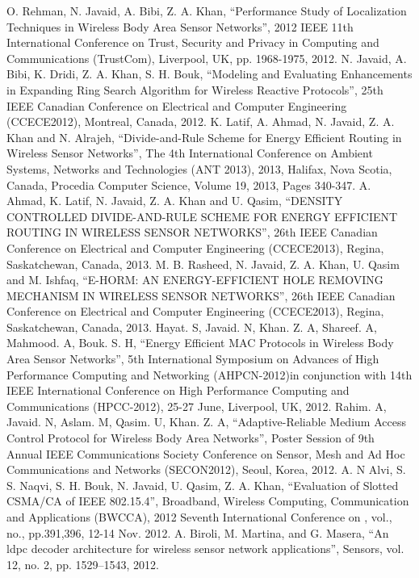 \documentclass[3p,times,procedia]{elsarticle}
\begin{document}
\vspace{-0.4cm}
\begin{thebibliography}{1}
O. Rehman, N. Javaid, A. Bibi, Z. A. Khan, ``Performance Study of Localization Techniques in Wireless Body Area Sensor Networks'', 2012 IEEE 11th International Conference on Trust, Security and Privacy in Computing and Communications (TrustCom), Liverpool, UK, pp. 1968-1975, 2012.
N. Javaid, A. Bibi, K. Dridi, Z. A. Khan, S. H. Bouk, ``Modeling and Evaluating Enhancements in Expanding Ring Search Algorithm for Wireless Reactive Protocols'', 25th IEEE Canadian Conference on Electrical and Computer Engineering (CCECE2012), Montreal, Canada, 2012.
K. Latif, A. Ahmad, N. Javaid, Z. A. Khan and N. Alrajeh, ``Divide-and-Rule Scheme for Energy Efficient Routing in Wireless Sensor Networks'', The 4th International Conference on Ambient Systems, Networks and Technologies (ANT 2013), 2013, Halifax, Nova Scotia, Canada, Procedia Computer Science, Volume 19, 2013, Pages 340-347.
A. Ahmad, K. Latif, N. Javaid, Z. A. Khan and U. Qasim,	``DENSITY CONTROLLED DIVIDE-AND-RULE SCHEME FOR ENERGY EFFICIENT ROUTING IN WIRELESS SENSOR NETWORKS'', 26th IEEE Canadian Conference on Electrical and Computer Engineering (CCECE2013), Regina, Saskatchewan, Canada, 2013.
M. B. Rasheed, N. Javaid, Z. A. Khan, U. Qasim and M. Ishfaq, ``E-HORM: AN ENERGY-EFFICIENT HOLE REMOVING MECHANISM IN WIRELESS SENSOR NETWORKS'', 26th IEEE Canadian Conference on Electrical and Computer Engineering (CCECE2013), Regina, Saskatchewan, Canada, 2013.
Hayat. S, Javaid. N, Khan. Z. A, Shareef. A, Mahmood. A, Bouk. S. H, ``Energy Efficient MAC Protocols in Wireless Body Area Sensor Networks'', 5th International Symposium on Advances of High Performance Computing and Networking (AHPCN-2012)in conjunction with 14th IEEE International Conference on High Performance Computing and Communications (HPCC-2012), 25-27 June, Liverpool, UK, 2012.
Rahim. A, Javaid. N, Aslam. M, Qasim. U, Khan. Z. A, ``Adaptive-Reliable Medium Access Control Protocol for Wireless Body Area Networks'', Poster Session of 9th Annual IEEE Communications Society Conference on Sensor, Mesh and Ad Hoc Communications and Networks (SECON2012), Seoul, Korea, 2012.
A. N Alvi, S. S. Naqvi, S. H. Bouk, N. Javaid, U. Qasim, Z. A. Khan, ``Evaluation of Slotted CSMA/CA of IEEE 802.15.4'', Broadband, Wireless Computing, Communication and Applications (BWCCA), 2012 Seventh International Conference on , vol., no., pp.391,396, 12-14 Nov. 2012.
A. Biroli, M. Martina, and G. Masera, ``An ldpc decoder architecture for wireless sensor network applications'', Sensors, vol. 12, no. 2, pp. 1529–1543, 2012.


\end{thebibliography}
\end{document}
